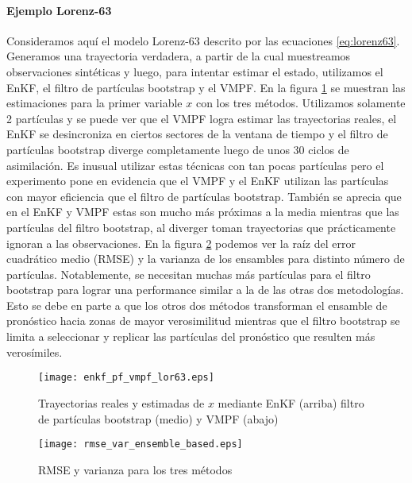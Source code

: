 \paragraph{Ejemplo Lorenz-63}

Consideramos aquí el modelo Lorenz-63 descrito por las ecuaciones \ref{eq:lorenz63}. Generamos una trayectoria verdadera, a partir de la cual muestreamos observaciones sintéticas y luego, para intentar estimar el estado, utilizamos el EnKF, el filtro de partículas bootstrap y el VMPF. En la figura \ref{fig:enkf_pf_vmpf_lor63} se muestran las estimaciones para la primer variable $x$ con los tres métodos. Utilizamos solamente 2 partículas y se puede ver que el VMPF logra estimar las trayectorias reales, el EnKF se desincroniza en ciertos sectores de la ventana de tiempo y el filtro de partículas bootstrap diverge completamente luego de unos 30 ciclos de asimilación. Es inusual utilizar estas técnicas con tan pocas partículas pero el experimento pone en evidencia que el VMPF y el EnKF utilizan las partículas con mayor eficiencia que el filtro de partículas bootstrap. También se aprecia que en el EnKF y VMPF estas son mucho más próximas a la media mientras que las partículas del filtro bootstrap, al diverger toman trayectorias que prácticamente ignoran a las observaciones. En la figura \ref{fig:rmse_var_ensemble_based} podemos ver la raíz del error cuadrático medio (RMSE) y la varianza de los ensambles para distinto número de partículas. Notablemente, se necesitan muchas más partículas para el filtro bootstrap para lograr una performance similar a la de las otras dos metodologías. Esto se debe en parte a que los otros dos métodos transforman el ensamble de pronóstico hacia zonas de mayor verosimilitud mientras que el filtro bootstrap se limita a seleccionar y replicar las partículas del pronóstico que resulten más verosímiles.

\begin{figure}[h!]
    \centering
    \texttt{[image: enkf\_pf\_vmpf\_lor63.eps]}
    \caption{Trayectorias reales y estimadas de $x$ mediante EnKF (arriba) filtro de partículas bootstrap (medio) y VMPF (abajo)}
    \label{fig:enkf_pf_vmpf_lor63}
\end{figure}

\begin{figure}[h!]
    \centering
    \texttt{[image: rmse\_var\_ensemble\_based.eps]}
    \caption{RMSE y varianza para los tres métodos}
    \label{fig:rmse_var_ensemble_based}
\end{figure}
